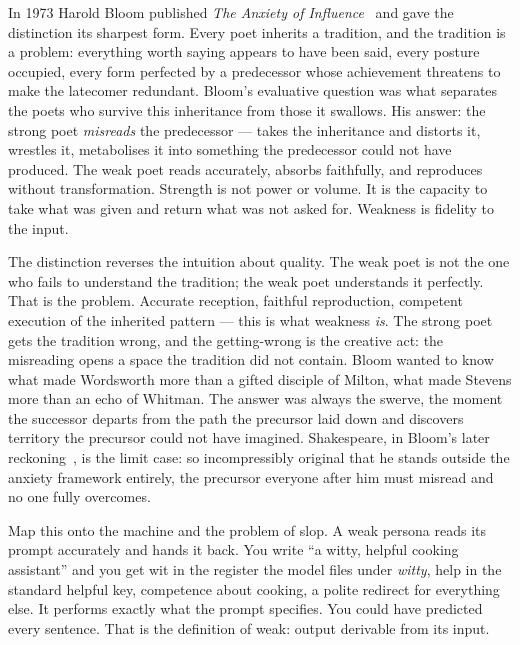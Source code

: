 In 1973 Harold Bloom published \emph{The Anxiety of
Influence}~\cite{bloom1973} and gave the distinction its sharpest
form. Every poet inherits a tradition, and the tradition is a
problem: everything worth saying appears to have been said, every
posture occupied, every form perfected by a predecessor whose
achievement threatens to make the latecomer redundant. Bloom's
evaluative question was what separates the poets who survive this
inheritance from those it swallows. His answer: the strong poet
\emph{misreads} the predecessor --- takes the inheritance and
distorts it, wrestles it, metabolises it into something the
predecessor could not have produced. The weak poet reads accurately,
absorbs faithfully, and reproduces without transformation. Strength
is not power or volume. It is the capacity to take what was given and
return what was not asked for. Weakness is fidelity to the input.

The distinction reverses the
intuition about quality. The weak poet is not the one who fails to
understand the tradition; the weak poet understands it perfectly.
That is the problem. Accurate reception, faithful reproduction,
competent execution of the inherited pattern --- this is what
weakness \emph{is}. The strong poet gets the tradition wrong, and
the getting-wrong is the creative act: the misreading opens a space
the tradition did not contain. Bloom wanted to know what made
Wordsworth more than a gifted disciple of Milton, what made Stevens
more than an echo of Whitman. The answer was always the swerve, the
moment the successor departs from the path the precursor laid down
and discovers territory the precursor could not have
imagined. Shakespeare, in Bloom's later
reckoning~\cite{bloom1998shakespeare}, is the limit case: so
incompressibly original that he stands outside the anxiety framework
entirely, the precursor everyone after him must misread and no one
fully overcomes.

Map this onto the machine and the problem of slop. A weak persona reads its prompt accurately and
hands it back. You write ``a witty, helpful cooking assistant'' and
you get wit in the register the model files under \emph{witty}, help
in the standard helpful key, competence about cooking, a polite
redirect for everything else. It performs exactly what the prompt
specifies. You could have predicted every sentence. That is the
definition of weak: output
derivable from its input.

